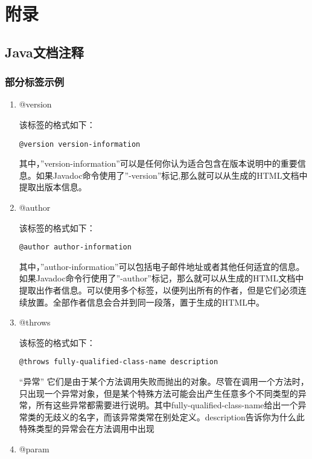 
\chapter{附录}
\label{chap05}

\section{Java文档注释}

\subsection{部分标签示例}

\begin{enumerate}
\item @version

该标签的格式如下：

\begin{lstlisting}
@version version-information
\end{lstlisting}
其中，”version-information”可以是任何你认为适合包含在版本说明中的重要信息。如果Javadoc命令使用了”-version”标记,那么就可以从生成的HTML文档中提取出版本信息。

\item @author

该标签的格式如下：
\begin{lstlisting}
@author author-information
\end{lstlisting}
其中，”author-information”可以包括电子邮件地址或者其他任何适宜的信息。如果Javadoc命令行使用了”-author”标记，那么就可以从生成的HTML文档中提取出作者信息。可以使用多个标签，以便列出所有的作者，但是它们必须连续放置。全部作者信息会合并到同一段落，置于生成的HTML中。

\item	 @throws

该标签的格式如下：
\begin{lstlisting}
@throws fully-qualified-class-name description
\end{lstlisting}
“异常” 它们是由于某个方法调用失败而抛出的对象。尽管在调用一个方法时，只出现一个异常对象，但是某个特殊方法可能会出产生任意多个不同类型的异常，所有这些异常都需要进行说明。其中fully-qualified-class-name给出一个异常类的无歧义的名字，而该异常类常在别处定义。description告诉你为什么此特殊类型的异常会在方法调用中出现

\item @param


\end{enumerate}
